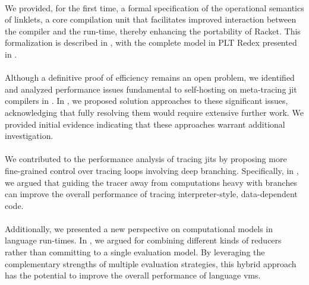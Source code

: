     \paragraph{}%
        We provided, for the first time, a formal specification of the operational semantics of linklets, a core compilation unit that facilitates improved interaction between the compiler and the run-time, thereby enhancing the portability of Racket. This formalization is described in , with the complete model in PLT Redex presented in .

    \paragraph{}%
        Although a definitive proof of efficiency remains an open problem, we identified and analyzed performance issues fundamental to self-hosting on meta-tracing \gls{jit} compilers in . In , we proposed solution approaches to these significant issues, acknowledging that fully resolving them would require extensive further work. We provided initial evidence indicating that these approaches warrant additional investigation.

    \paragraph{}%
        We contributed to the performance analysis of tracing \glspl{jit} by proposing more fine-grained control over tracing loops involving deep branching. Specifically, in , we argued that guiding the tracer away from computations heavy with branches can improve the overall performance of tracing interpreter-style, data-dependent code.

    \paragraph{}%
        Additionally, we presented a new perspective on computational models in language run-times. In , we argued for combining different kinds of reducers rather than committing to a single evaluation model. By leveraging the complementary strengths of multiple evaluation strategies, this hybrid approach has the potential to improve the overall performance of language \glspl{vm}.

